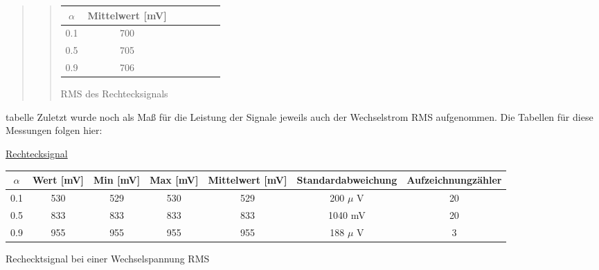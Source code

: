 \begin{quote}
\begin{quote}
            \hspace{-4em}
                  \begin{tabular}{|c|c|c|c|c|c|c|}
                  \hline
                   $\alpha $ &  Mittelwert [mV] \\ \hline 
                   0.1 &  700 \\ \hline
                   0.5 &  705 \\ \hline
                   0.9 &  706 \\ \hline           
                 \end{tabular}
                       \caption{RMS des Rechtecksignals}
                        \label{tablelabel1}
        
    \end{quote}


    
    


    
        
\end{quote}





tabelle
    Zuletzt wurde noch als Maß für die Leistung der Signale jeweils auch der
    Wechselstrom RMS aufgenommen. Die Tabellen für diese Messungen folgen hier:
    
    \underline{Rechtecksignal}
        
            \hspace{-4em}
                  \begin{tabular}{|c|c|c|c|c|c|c|}
                  \hline
                   $\alpha $ & Wert [mV] & Min [mV] & Max [mV] & Mittelwert
                   [mV] & Standardabweichung & Aufzeichnungzähler\\ \hline 
                   0.1 & 530 & 529 & 530 & 529 & 200 $\mu$ V & 20 \\ \hline
                   0.5 & 833 & 833 & 833 & 833 & 1040 mV & 20 \\ \hline
                   0.9 & 955 & 955 & 955 & 955 & 188 $\mu$ V & 3 \\ \hline           
                 \end{tabular}
                       \caption{Rechecktsignal bei einer Wechselspannung RMS}
                        \label{tablelabel1}
        
 
    \vspace{1.5em}
                 
